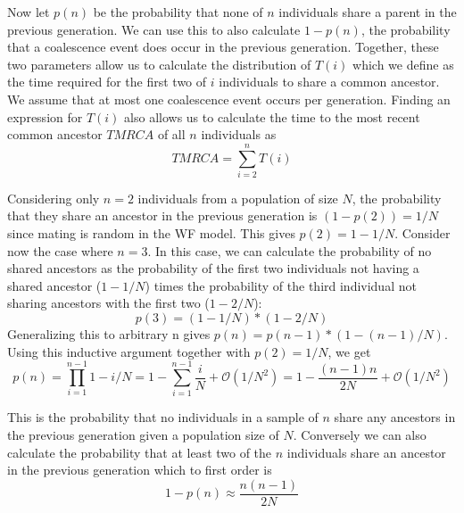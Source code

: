 \documentclass{article}
\begin{document}
Now let $p(n)$ be the probability that none of $n$ individuals share a parent in the previous generation. We can use this to also calculate $1-p(n)$, the probability that a coalescence event does occur in the previous generation. Together, these two parameters allow us to calculate the distribution of $T(i)$ which we define as the time required for the first two of $i$ individuals to share a common ancestor. We assume that at most one coalescence event occurs per generation. Finding an expression for $T(i)$ also allows us to calculate the time to the most recent common ancestor $TMRCA$ of all $n$ individuals as
\begin{equation}
TMRCA = \sum_{i=2}^n{T(i)}
\end{equation}

Considering only $n=2$ individuals from a population of size $N$, the probability that they share an ancestor in the previous generation is $(1 - p(2)) = 1/N$ since mating is random in the WF model. This gives $p(2) = 1-1/N$. Consider now the case where $n=3$. In this case, we can calculate the probability of no shared ancestors as the probability of the first two individuals not having a shared ancestor ($1-1/N$) times the probability of the third individual not sharing ancestors with the first two ($1-2/N$):
\begin{equation}
p(3) = (1-1/N) * (1-2/N)
\end{equation}
Generalizing this to arbitrary n gives $p(n) = p(n-1) * (1-(n-1)/N)$. Using this inductive argument together with $p(2) = 1/N$, we get
\begin{equation}
p(n) = \prod_{i=1}^{n-1}{1-i/N} = 1 - \sum_{i=1}^{n-1}{\dfrac{i}{N}} + \mathcal{O}(1/N^2) = 1 - \dfrac{(n-1)n}{2N}+ \mathcal{O}(1/N^2)
\end{equation}

This is the probability that no individuals in a sample of $n$ share any ancestors in the previous generation given a population size of $N$.
Conversely we can also calculate the probability that at least two of the $n$ individuals share an ancestor in the previous generation which to first order is
\begin{equation}
1 - p(n) \approx \dfrac{n(n-1)}{2N}
\end{equation}
\end{document}
